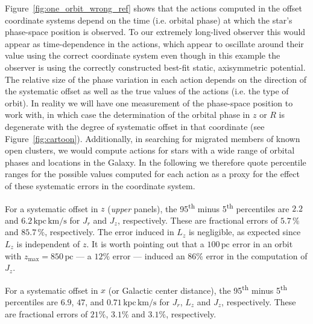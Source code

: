 \documentclass[twocolumn]{aastex62}
\newcommand{\pc}{\text{pc}}
\newcommand{\kms}{\text{km}/\text{s}}
\newcommand{\actunit}{\text{kpc}\,\kms}
\begin{document}
Figure~\ref{fig:one_orbit_wrong_ref} shows that the actions computed in the
offset coordinate systems depend on the time (i.e. orbital phase) at which the
star's phase-space position is observed. To our extremely long-lived observer
this would appear as time-dependence in the actions, which appear to oscillate
around their value using the correct coordinate system even though in this
example the observer is using the correctly constructed best-fit static,
axisymmetric potential. The relative size of the phase variation in each
action depends on the direction of the systematic offset as well as the true
values of the actions (i.e. the type of orbit). In reality we will have one
measurement of the phase-space position to work with, in which case the
determination of the orbital phase in $z$ or $R$ is degenerate with the degree
of systematic offset in that coordinate (see Figure~\ref{fig:cartoon}).
Additionally, in searching for migrated members of known open clusters, we
would compute actions for stars with a wide range of orbital phases and
locations in the Galaxy. In the following we therefore quote percentile ranges
for the possible values computed for each action as a proxy for the effect of
these systematic errors in the coordinate system.

For a systematic offset in $z$ ({\em upper} panels), the
95\textsuperscript{th} minus 5\textsuperscript{th} percentiles are $2.2$ and
$6.2\,\actunit$ for $J_r$ and $J_z$, respectively. These are fractional errors
of $5.7\,\%$ and $85.7\,\%$, respectively. The error induced in $L_z$ is
negligible, as expected since $L_z$ is independent of $z$. It is worth
pointing out that a $100\,\pc$ error in an orbit with
$z_{\text{max}}=850\,\pc$ --- a $12\%$ error
--- induced an $86\%$ error in the computation of $J_z$.

For a systematic offset in $x$ (or Galactic center distance), the
95\textsuperscript{th} minus 5\textsuperscript{th} percentiles are $6.9$,
$47$, and $0.71\,\actunit$ for $J_r$, $L_z$ and $J_z$, respectively. These are
fractional errors of $21\%$, $3.1\%$ and $3.1\%$, respectively.
\end{document}
